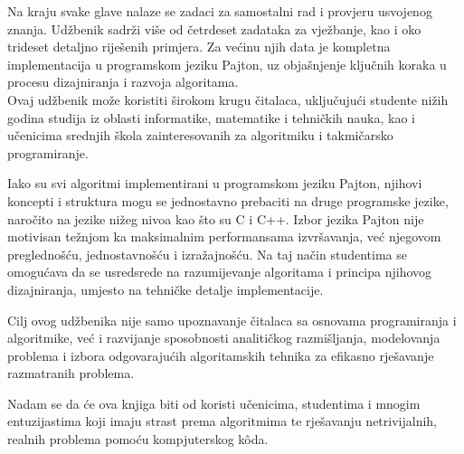 \documentclass[b5paper, utf8, 11pt, colorlinks]{book}
\begin{document}
Na kraju svake glave nalaze se zadaci za samostalni rad i provjeru usvojenog znanja. Udžbenik sadrži više od četrdeset zadataka za vježbanje, kao i oko trideset detaljno riješenih primjera. Za većinu njih data je kompletna implementacija u programskom jeziku Pajton, uz objašnjenje ključnih koraka u procesu dizajniranja i razvoja algoritama.\\

Ovaj udžbenik može koristiti širokom krugu čitalaca, uključujući studente nižih godina studija iz oblasti informatike, matematike i tehničkih nauka, kao i učenicima srednjih škola zainteresovanih za algoritmiku i takmičarsko programiranje.

Iako su svi algoritmi implementirani u programskom jeziku Pajton, njihovi koncepti i struktura mogu se jednostavno prebaciti na druge programske jezike, naročito na jezike nižeg nivoa kao što su C i C++. Izbor jezika Pajton nije motivisan težnjom ka maksimalnim performansama izvršavanja, već njegovom preglednošću, jednostavnošću i izražajnošću. Na taj način studentima se omogućava da se usredsrede na razumijevanje algoritama i principa njihovog dizajniranja, umjesto na tehničke detalje implementacije.

Cilj ovog udžbenika nije samo upoznavanje čitalaca sa osnovama programiranja i algoritmike, već i razvijanje sposobnosti analitičkog razmišljanja, modelovanja problema i izbora odgovarajućih algoritamskih tehnika za efikasno rješavanje razmatranih problema. 

Nadam se da će ova knjiga biti od koristi učenicima, studentima i mnogim entuzijastima koji imaju strast prema algoritmima te rješavanju netrivijalnih, realnih problema pomoću kompjuterskog k\^oda.  




 
\end{document}
